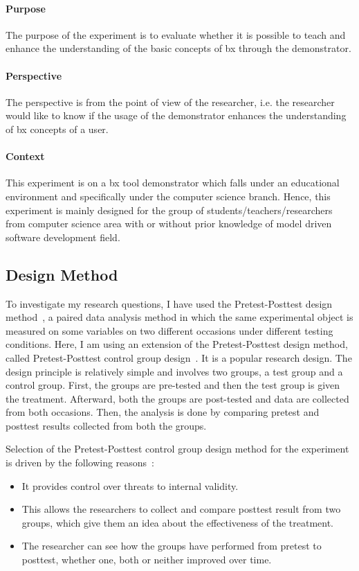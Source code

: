 \paragraph{Purpose}
The purpose of the experiment is to evaluate whether it is possible to teach and enhance the understanding of the basic concepts of bx through the demonstrator.

\paragraph{Perspective}
The perspective is from the point of view of the researcher, i.e. the researcher would like to know if the usage of the demonstrator enhances the understanding of bx concepts of a user.

\paragraph{Context}
This experiment is on a bx tool demonstrator which falls under an educational environment and specifically under the computer science branch. Hence, this experiment is mainly designed for the group of students/teachers/researchers from computer science area with or without prior knowledge of model driven software development field.

\subsection{Design Method}\label{subsec:designmethod} 
To investigate my research questions, I have used the Pretest-Posttest design method~\cite{analysisprepostdesigns}, a paired data analysis method in which the same experimental object is measured on some variables on two different occasions under different testing conditions. Here, I am using an extension of the Pretest-Posttest design method, called Pretest-Posttest control group design~\cite{expandquasiexpdesign}. It is a popular research design. The design principle is relatively simple and involves two groups, a test group and a control group. First, the groups are pre-tested and then the test group is given the treatment. Afterward, both the groups are post-tested and data are collected from both occasions. Then, the analysis is done by comparing pretest and posttest results collected from both the groups.

Selection of the Pretest-Posttest control group design method for the experiment is driven by the following reasons~\cite{anovapreposttest}:
\begin{itemize}
	\item It provides control over threats to internal validity.
	\item This allows the researchers to collect and compare posttest result from two groups, which give them an idea about the effectiveness of the treatment.
	\item The researcher can see how the groups have performed from pretest to posttest, whether one, both or neither improved over time.
\end{itemize}


